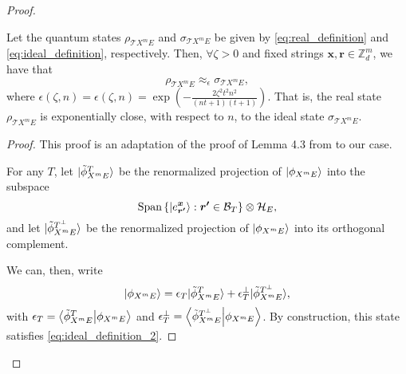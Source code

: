 \begin{proof}
\begin{lemma}

Let the quantum states $\rho_{\mathcal{T}X^m E}$ and $\sigma_{\mathcal{T}X^m E}$   be given by \eqref{eq:real_definition} and \eqref{eq:ideal_definition}, respectively. Then, $\forall \zeta >0$ and fixed strings $\boldsymbol{x}, \boldsymbol{r}\in \mathbb{Z}_d^{m}$, we have that
\begin{equation*}
    \rho_{\mathcal{T}X^m E} \approx_\epsilon \sigma_{\mathcal{T}X^m E},
\end{equation*}
where $\epsilon(\zeta, n) = \epsilon(\zeta, n) = \exp( -\frac{2 \zeta^2t^2n^2}{(nt+1)(t+1)})$. That is, the real state $\rho_{\mathcal{T}X^m E}$ is exponentially close, with respect to $n$, to the ideal state $\sigma_{\mathcal{T}X^m E}$.
\label{lemma:dishonest_bob_2}
\end{lemma}



\begin{proof}
This proof is an adaptation of the proof of Lemma 4.3 from \cite{DFLSS09} to our case.

For any $T$, let $| \tilde{\phi}_{X^m E}^T \rangle$ be  the renormalized projection of $| \phi_{X^m E} \rangle$ into the subspace $$\text{Span}\left\{ | e^{\boldsymbol{x}}_{\boldsymbol{r'}} \rangle : \boldsymbol{r'} \in \mathcal{B}_{T} \right\}\otimes \mathcal{H}_{E},$$ and  let $| \tilde{\phi}_{X^m E}^{T^\perp} \rangle$ be the renormalized projection of $| \phi_{X^m E} \rangle$ into its orthogonal complement. 


We can, then, write
\begin{equation*}
    | \phi_{X^m E} \rangle = \epsilon_T | \tilde{\phi}_{X^m E}^T \rangle + \epsilon_T^\perp | \tilde{\phi}_{X^m E}^{T^\perp} \rangle,
\end{equation*}
with  $\epsilon_T = \braket{\tilde{\phi}_{X^m E}^T}{\phi_{X^m E}}$ and $\epsilon_T^\perp = \braket{\tilde{\phi}_{X^m E}^{T^\perp}}{\phi_{X^m E}}$. By construction, this state satisfies \eqref{eq:ideal_definition_2}.


\end{proof}
\end{proof}
